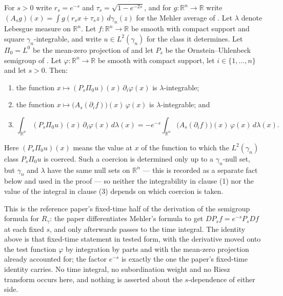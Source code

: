 \begin{lemma}
For $s > 0$ write $r_s = e^{-s}$ and $\tau_s = \sqrt{1-e^{-2s}}$, and for
$g : \mathbb{R}^n \to \mathbb{R}$ write
$(A_s g)(x) = \int g(r_sx+\tau_sz)\,d\gamma_n(z)$ for the Mehler average of
.  Let $\lambda$ denote Lebesgue measure on
$\mathbb{R}^n$.  Let $f : \mathbb{R}^n \to \mathbb{R}$ be smooth with compact
support and square $\gamma_n$-integrable, and write $u \in L^2(\gamma_n)$ for the
class it determines.  Let $\Pi_0 = L^0$ be the mean-zero projection of
 and let $P_s$ be the Ornstein--Uhlenbeck semigroup of
.  Let $\varphi : \mathbb{R}^n \to \mathbb{R}$ be smooth
with compact support, let $i \in \{1,\ldots,n\}$ and let $s > 0$.  Then:
\begin{enumerate}
\item the function
$x \mapsto (P_s\Pi_0u)(x)\,\partial_i\varphi(x)$ is $\lambda$-integrable;
\item the function
$x \mapsto \bigl(A_s(\partial_if)\bigr)(x)\,\varphi(x)$ is $\lambda$-integrable;
and
\item
\[
  \int_{\mathbb{R}^n}(P_s\Pi_0u)(x)\,\partial_i\varphi(x)\,d\lambda(x)
    = -e^{-s}\int_{\mathbb{R}^n}
        \bigl(A_s(\partial_if)\bigr)(x)\,\varphi(x)\,d\lambda(x) .
\]
\end{enumerate}

Here $(P_s\Pi_0u)(x)$ means the value at $x$ of the function to which the
$L^2(\gamma_n)$ class $P_s\Pi_0u$ is coerced.  Such a coercion is determined only
up to a $\gamma_n$-null set, but $\gamma_n$ and $\lambda$ have the same null sets
on $\mathbb{R}^n$ --- this is recorded as a separate fact below and used in the
proof --- so neither the integrability in clause (1) nor the value of the
integral in clause (3) depends on which coercion is taken.

This is the reference paper's fixed-time half of the derivation of the semigroup
formula for $R_\gamma$: the paper differentiates Mehler's formula to get
$DP_sf = e^{-s}P_sDf$ at each fixed $s$, and only afterwards passes to the time
integral.  The identity above is that fixed-time statement in tested form, with
the derivative moved onto the test function $\varphi$ by integration by parts and
with the mean-zero projection already accounted for; the factor $e^{-s}$ is
exactly the one the paper's fixed-time identity carries.  No time integral, no
subordination weight and no Riesz transform occurs here, and nothing is asserted
about the $s$-dependence of either side.
\end{lemma}
